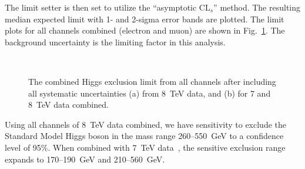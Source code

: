 The limit setter is then set to utilize
the ``asymptotic CL$_{s}$''
\cite{cite:asympcls1,cite:asympcls2} method. 
The resulting median
expected limit with 1- and 2-sigma error bands are plotted.
The limit plots for all channels combined
(electron and muon)
are shown in
Fig.~\ref{fig:limitsetup:combinedlimit}. 
The background uncertainty is the limiting factor in this analysis.
\begin{figure}[htb] 
  \begin{center}
    \\
    \caption{The combined Higgs exclusion limit from all channels
      after including all systematic uncertainties (a) from 8~TeV
      data, and (b) for 7 and 8~TeV data combined.
    }
    \label{fig:limitsetup:combinedlimit}
  \end{center}
\end{figure}

Using all channels of 8~TeV data combined, we have sensitivity to
exclude the Standard Model Higgs boson in the mass range
260--550~GeV
to a confidence level of 95\%.
When combined with 7~TeV data~\cite{HIG-12-003}, the sensitive exclusion range expands to
170--190~GeV and 210--560~GeV.
